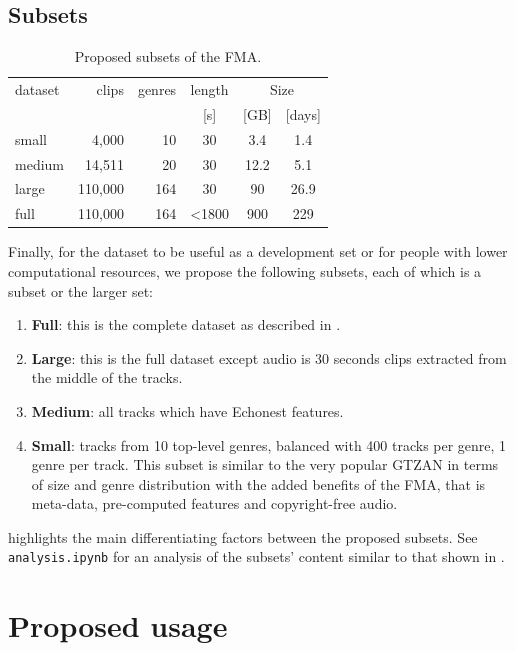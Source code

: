 \documentclass{article}
\begin{document}
\subsection{Subsets} \label{sec:subsets}

\begin{table}
	\centering
	\begin{tabular}{lrrccc}
		\toprule
		dataset & clips & genres & length & \multicolumn{2}{c}{Size} \\
		\cmidrule{5-6}
		        &         &          &  [s]   & [GB] & [days] \\
		\midrule
		small  &   4,000 & 10  & 30    & 3.4  & 1.4  \\
		medium &  14,511 & 20  & 30    & 12.2 & 5.1  \\
		large  & 110,000 & 164 & 30    & 90   & 26.9 \\
		full   & 110,000 & 164 & <1800 & 900  & 229  \\
		\bottomrule
	\end{tabular}
	\caption{Proposed subsets of the FMA.}
	\label{tab:subsets}
\end{table}

Finally, for the dataset to be useful as a development set or for people with lower computational resources, we propose the following subsets, each of which is a subset or the larger set:
\begin{enumerate}
	\item \textbf{Full}: this is the complete dataset as described in .
	\item \textbf{Large}: this is the full dataset except audio is 30 seconds clips extracted from the middle of the tracks.
	\item \textbf{Medium}: all tracks which have Echonest features.
	\item \textbf{Small}: tracks from 10 top-level genres, balanced with 400 tracks per genre, 1 genre per track. This subset is similar to the very popular GTZAN in terms of size and genre distribution with the added benefits of the FMA, that is meta-data, pre-computed features and copyright-free audio.
\end{enumerate}
 highlights the main differentiating factors between the proposed subsets. See \texttt{analysis.ipynb} for an analysis of the subsets' content similar to that shown in .


\section{Proposed usage} %
\end{document}
